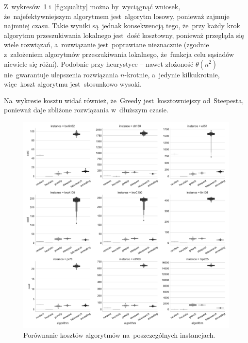 Z~wykresów~\ref{fig:cost} i~\ref{fig:quality} można by~wyciągnąć wniosek, że~najefektywniejszym algorytmem jest~algorytm losowy, ponieważ zajmuje najmniej czasu. Takie wyniki są~jednak konsekwencją tego, że~przy każdy krok algorytmu przeszukiwania lokalnego jest~dość kosztowny, ponieważ przegląda się wiele rozwiązań, a~rozwiązanie jest~poprawiane nieznacznie (zgodnie z~założeniem algorytmów przeszukiwania lokalnego, że~funkcja celu sąsiadów niewiele się różni). Podobnie przy heurystyce -- nawet złożoność $\theta(n^2)$ nie~gwarantuje ulepszenia rozwiązania $n$-krotnie, a~jedynie kilkukrotnie, więc~koszt algorytmu jest~stosunkowo wysoki.

Na~wykresie kosztu widać również, że~Greedy jest~kosztowniejszy od~Steepesta, ponieważ daje zbliżone rozwiązania w~dłuższym czasie.

\begin{figure}[H]
\begin{center}
\includegraphics[width=1.0\textwidth]{graphs/cost_comparison_letval.pdf}
\end{center}
\caption{Porównanie kosztów algorytmów na~poszczególnych instancjach.}
\label{fig:cost}
\end{figure}

